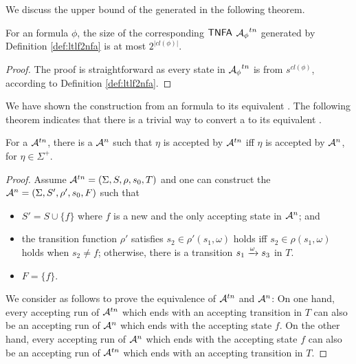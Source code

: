 We discuss the upper bound of the generated \TNFA in the following theorem.

\begin{theorem}\label{thm:tnfaBound}
For an \ltlf formula $\phi$, the size of the corresponding ${\sf TNFA}$ ${\mathcal{A}_{\phi}}^{tn}$ generated by Definition \ref{def:ltlf2nfa} is at most $2^{|cl(\phi)|}$.
\end{theorem}
\begin{proof}
	The proof is straightforward as every state in ${\mathcal{A}_{\phi}}^{tn}$ is from $s^{cl(\phi)}$, according to Definition \ref{def:ltlf2nfa}.
\end{proof}

We have shown the construction from an \ltlf formula to its equivalent \TNFA. The following theorem indicates that there is a trivial way to convert a \TNFA to its equivalent \NFA. 

\begin{theorem}\label{tnfa2nfa}
For a \TNFA $\mathcal{A}^{tn}$, there is a \NFA $\mathcal{A}^n$ such that $\eta$ is accepted by $\mathcal{A}^{tn}$ iff $\eta$ is accepted by $\mathcal{A}^n$, for $\eta\in \Sigma^+$. 
\end{theorem}
\begin{proof}
Assume $\mathcal{A}^{tn}=(\Sigma, S, \rho, s_0, T)$ and one can construct the \NFA $\mathcal{A}^{n} = (\Sigma, S', \rho', s_0, F)$ such that 
\begin{itemize}
	\item $S' = S\cup \{f\}$ where $f$ is a new and the only accepting state in $\mathcal{A}^n$; and 
	\item the transition function $\rho'$ satisfies $s_2\in \rho'(s_1,\omega)$ holds iff $s_2\in \rho(s_1, \omega)$ holds when $s_2\not = f$; otherwise, there is a transition $s_1\xrightarrow[]{\omega}s_3$ in $T$. 
	\item $F=\{f\}$.
\end{itemize}
We consider as follows to prove the equivalence of $\mathcal{A}^{tn}$ and $\mathcal{A}^n$: On one hand, every accepting run of $\mathcal{A}^{tn}$ which ends with an accepting transition in $T$ can also be an accepting run of $\mathcal{A}^n$ which ends with the accepting state $f$. On the other hand, every accepting run of $\mathcal{A}^{n}$ which ends with the accepting state $f$ can also be an accepting run of $\mathcal{A}^{tn}$ which ends with an accepting transition in $T$.
\end{proof}



